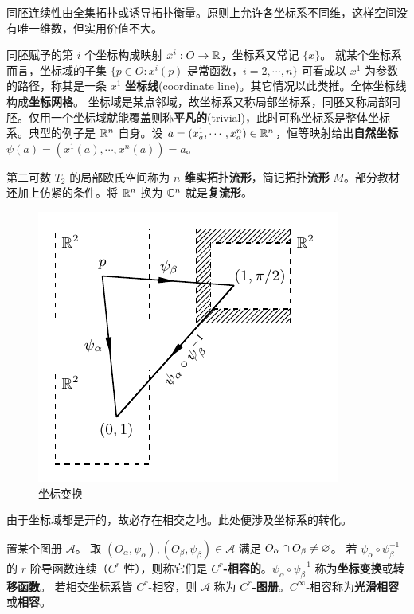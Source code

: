 \begin{remark}
    同胚连续性由全集拓扑或诱导拓扑衡量。原则上允许各坐标系不同维，这样空间没有唯一维数，但实用价值不大。
\end{remark}

同胚赋予的第 $i$ 个坐标构成映射 $x^i:O\to\mathbb{R}$，坐标系又常记 $\{x\}$。
就某个坐标系而言，坐标域的子集
    $\{p\in O: x^i(p)$ 是常函数，$i=2,\cdots,n\}$
可看成以 $x^1$ 为参数的路径，称其是一条 $x^1$ \textbf{坐标线}(coordinate line)。其它情况以此类推。全体坐标线构成\textbf{坐标网格}。
坐标域是某点邻域，故坐标系又称局部坐标系，同胚又称局部同胚。仅用一个坐标域就能覆盖则称\textbf{平凡的}(trivial)，此时可称坐标系是整体坐标系。典型的例子是 $\mathbb{R}^n$ 自身。设 $a=(x^1_a,\cdots,x^n_a)\in\mathbb{R}^n$，恒等映射给出\textbf{自然坐标} $\psi(a)=(x^1(a),\cdots,x^n(a))=a$。

\begin{definition}
    第二可数 $T_2$ 的局部欧氏空间称为 \textbf{$n$ 维实拓扑流形}，简记\textbf{拓扑流形} $M$。部分教材还加上仿紧的条件。将 $\mathbb{R}^n$ 换为 $\mathbb{C}^n$ 就是\textbf{复流形}。
\end{definition}

\begin{figure}[ht]
    \centering
\includegraphics[width=.4\textwidth]{fig/appx/coor-chan.pdf}
    \caption{坐标变换}\label{fig:coor-chan}
\end{figure}

由于坐标域都是开的，故必存在相交之地。此处便涉及坐标系的转化。

\begin{definition}
    置某个图册 $\mathcal A$。
    取 $(O_\alpha,\psi_\alpha),(O_\beta,\psi_\beta)\in \mathcal A$ 满足 $O_\alpha\cap O_\beta\ne\varnothing$。
    若 $\psi_\alpha\circ\psi_\beta^{-1}$ 的 $r$ 阶导函数连续（$C^r$ 性），则称它们是 $C^r$\textbf{-相容的}。$\psi_\alpha\circ\psi_\beta^{-1}$ 称为\textbf{坐标变换}或\textbf{转移函数}。
    若相交坐标系皆 $C^r$-相容，则 $\mathcal A$ 称为 $C^r$\textbf{-图册}。$C^\infty$-相容称为\textbf{光滑相容}或\textbf{相容}。
\end{definition}

